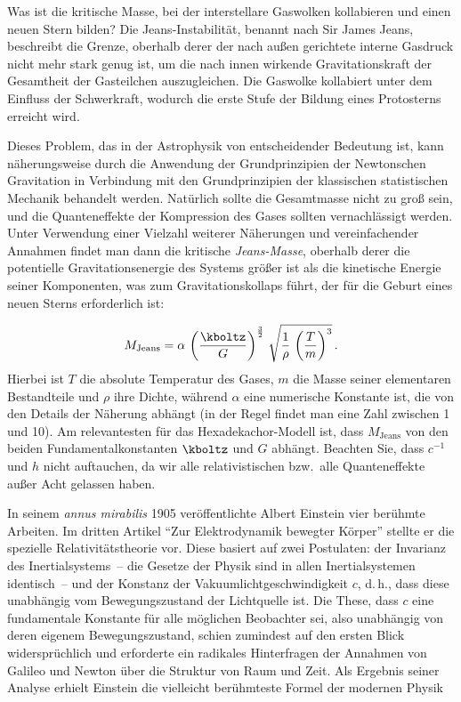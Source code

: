 \documentclass{scrartcl}
\begin{document}
Was ist die kritische Masse, bei der interstellare Gaswolken kollabieren und einen neuen Stern bilden? Die Jeans-Instabilität, benannt nach Sir James Jeans, beschreibt die Grenze, oberhalb derer der nach außen gerichtete interne Gasdruck nicht mehr stark genug ist, um die nach innen wirkende Gravitationskraft der Gesamtheit der Gasteilchen auszugleichen. Die Gaswolke kollabiert unter dem Einfluss der Schwerkraft, wodurch die erste Stufe der Bildung eines Protosterns erreicht wird.

Dieses Problem, das in der Astrophysik von entscheidender Bedeutung ist, kann näherungsweise durch die Anwendung der Grundprinzipien der Newtonschen Gravitation in Verbindung mit den Grundprinzipien der klassischen statistischen Mechanik behandelt werden. Natürlich sollte die Gesamtmasse nicht zu groß sein, und die Quanteneffekte der Kompression des Gases sollten vernachlässigt werden. Unter Verwendung einer Vielzahl weiterer Näherungen und vereinfachender Annahmen findet man dann die kritische \emph{Jeans-Masse}, oberhalb derer die potentielle Gravitationsenergie des Systems größer ist als die kinetische Energie seiner Komponenten, was zum Gravitationskollaps führt, der für die Geburt eines neuen Sterns erforderlich ist:

\begin{equation*}
  M_{\mathrm {Jeans}}=\alpha\,
    \left(\frac {\kboltz}{G}\right)^{\frac{3}{2}}\,
    \sqrt {{\frac {1}{\rho}}\, 
    \left({\frac {T}{m}}\right)^3}\,.
\end{equation*}
%
Hierbei ist $T$ die absolute Temperatur des Gases, $m$ die Masse seiner elementaren Bestandteile und $\rho$ ihre Dichte, während $\alpha$ eine numerische Konstante ist, die von den Details der Näherung abhängt (in der Regel findet man eine Zahl zwischen 1 und 10). Am relevantesten für das Hexadekachor-Modell ist, dass $M_{\mathrm {Jeans}}$ von den beiden Fundamentalkonstanten $\kboltz$ und $G$ abhängt. Beachten Sie, dass $c^{-1}$ und $h$ nicht auftauchen, da wir alle relativistischen bzw.\ alle Quanteneffekte außer Acht gelassen haben.


\newpage {}
\label{sec:0100}

In seinem \emph{annus mirabilis} 1905 veröffentlichte Albert Einstein vier berühmte Arbeiten. Im dritten Artikel \enquote{Zur Elektrodynamik bewegter Körper} stellte er die spezielle Relativitätstheorie vor. Diese basiert auf zwei Postulaten: der Invarianz des Inertialsystems~-- die Gesetze der Physik sind in allen Inertialsystemen identisch~-- und der Konstanz der Vakuumlichtgeschwindigkeit $c$, d.\,h., dass diese unabhängig vom Bewegungszustand der Lichtquelle ist. Die These, dass $c$ eine fundamentale Konstante für alle möglichen Beobachter sei, also unabhängig von deren eigenem Bewegungszustand, schien zumindest auf den ersten Blick widersprüchlich und erforderte ein radikales Hinterfragen der Annahmen von Galileo und Newton über die Struktur von Raum und Zeit. Als Ergebnis seiner Analyse erhielt Einstein die vielleicht berühmteste Formel der modernen Physik
\end{document}
